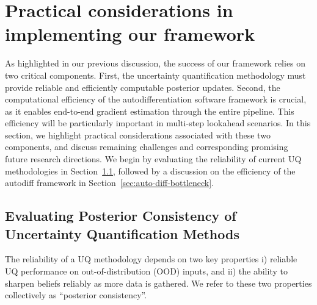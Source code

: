 \section{Practical considerations in implementing our framework}
\label{sec:practical_consideration}

As highlighted in our previous discussion, the success of our framework relies on  two critical components.  
First, the uncertainty quantification methodology must provide reliable and efficiently computable posterior updates. 
Second, the computational efficiency of the autodifferentiation software framework is crucial, 
as it enables end-to-end gradient estimation through the entire pipeline. 
This efficiency will be particularly important in multi-step lookahead scenarios. 
In this section, we highlight practical considerations associated with these two components, 
and discuss  remaining challenges and corresponding promising future research directions. 
We begin by evaluating the reliability of current UQ methodologies in Section~\ref{sec:eval_posterior_consis}, followed by a discussion on the efficiency of the autodiff framework in Section~\ref{sec:auto-diff-bottleneck}.


\subsection{Evaluating Posterior Consistency of Uncertainty Quantification Methods}
\label{sec:eval_posterior_consis}
The reliability of a UQ methodology depends on two key properties i) reliable UQ performance on out-of-distribution (OOD) inputs, and ii) the ability to sharpen beliefs reliably as more data is gathered. We refer to these two properties collectively as  ``posterior consistency''. 



